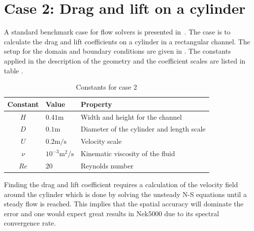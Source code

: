 \section{Case 2: Drag and lift on a cylinder}
A standard benchmark case for flow solvers is presented in~\cite{benchmark}. 
The case is to calculate the drag and lift coefficients on a cylinder in a rectangular channel.
The setup for the domain and boundary conditions are given in .
The constants applied in the description of the geometry and the coefficient scales are listed 
in table .
%
\begin{table}[h]
    \centering
    \begin{tabular}{c l l}
     Constant & Value & Property \\ \hline
    $H$ & $0.41\text{m}$ & Width and height for the channel \\
    $D$ & $0.1\text{m}$ & Diameter of the cylinder and length scale \\
    $U$ & $0.2\text{m/s}$ & Velocity scale \\
    $\nu$ &  $ 10^{-3}\text{m$^2$/s}$ & Kinematic viscosity of the fluid \\
    $Re$ & $20$ & Reynolds number \\ 
    \end{tabular}
    \caption{Constants for case 2}
    \label{tab:case2consts}
\end{table}
%
Finding the drag and lift coefficient requires a calculation of the velocity field around the cylinder
which is done by solving the unsteady N-S equations until a steady flow is reached. This implies that the
spatial accuracy will dominate the error and one would expect great results in Nek5000 
due to its spectral convergence rate.

